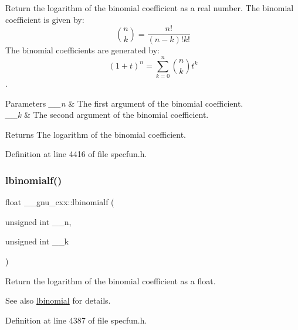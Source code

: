 Return the logarithm of the binomial coefficient as a real number. The binomial coefficient is given by\+: \[ \binom{n}{k} = \frac{n!}{(n-k)! k!} \] The binomial coefficients are generated by\+: \[ \left(1 + t\right)^n = \sum_{k=0}^n \binom{n}{k} t^k \]. 


\begin{DoxyParams}{Parameters}
{\em \+\_\+\+\_\+n} & The first argument of the binomial coefficient. \\
\hline
{\em \+\_\+\+\_\+k} & The second argument of the binomial coefficient. \\
\hline
\end{DoxyParams}
\begin{DoxyReturn}{Returns}
The logarithm of the binomial coefficient. 
\end{DoxyReturn}


Definition at line 4416 of file specfun.\+h.

\mbox{\label{group__gnu__math__spec__func_ga2fe55bab4211fb240e1eb01341914129}} 
\subsubsection{\texorpdfstring{lbinomialf()}{lbinomialf()}}
{\footnotesize\ttfamily float \+\_\+\+\_\+gnu\+\_\+cxx\+::lbinomialf (\begin{DoxyParamCaption}\item[{unsigned int}]{\+\_\+\+\_\+n,  }\item[{unsigned int}]{\+\_\+\+\_\+k }\end{DoxyParamCaption})\hspace{0.3cm}{\ttfamily [inline]}}

Return the logarithm of the binomial coefficient as a {\ttfamily float}.

\begin{DoxySeeAlso}{See also}
\hyperlink{group__gnu__math__spec__func_gabfa5aeba56edfa110846fc8e76963bc2}{lbinomial} for details. 
\end{DoxySeeAlso}


Definition at line 4387 of file specfun.\+h.

\mbox{\label{group__gnu__math__spec__func_ga20e6c250e10e20b9e2c3f68bf9a3d4c1}} 
